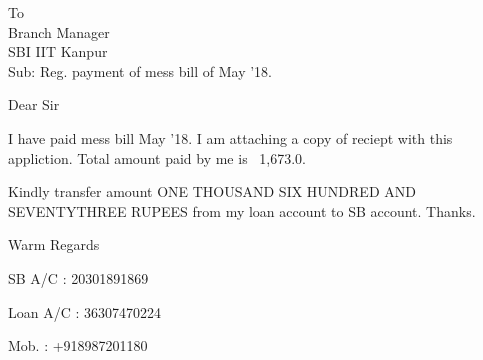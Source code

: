 \documentclass{letter}
\begin{document}
\begin{letter}{To \\ Branch Manager \\ SBI IIT Kanpur \\ Sub: Reg. payment of mess bill of May '18.}
\opening{Dear Sir}
I have paid mess bill May '18. I am attaching a copy of reciept with this appliction. Total amount paid by me is \rupee~1,673.0. \par 
Kindly transfer amount ONE THOUSAND SIX HUNDRED AND SEVENTYTHREE RUPEES from my loan account to SB account. Thanks.
\closing{Warm Regards}
SB A/C : 20301891869\par 
Loan A/C : 36307470224\par 
Mob. : +918987201180

\end{letter}
\end{document}
